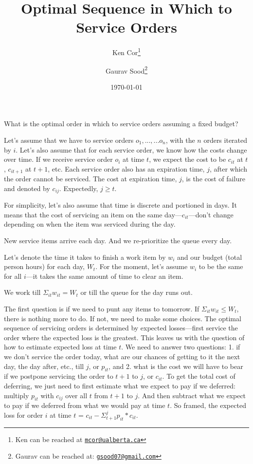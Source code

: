 \documentclass[12pt, letterpaper]{article}
\title{\Large{Optimal Sequence in Which to Service Orders}}
\author{Ken Cor\thanks{Ken can be reached at \href{mailto:mcor@ualberta.ca}{\footnotesize{\texttt{mcor@ualberta.ca}}}} \and Gaurav Sood\thanks{Gaurav can be reached at: \href{mailto:gsood07@gmail.com}{\footnotesize{\texttt{gsood07@gmail.com}}}}\vspace{.5cm}}
\date{\vspace{.5cm}\normalsize{\today}}
\begin{document}
\maketitle

\begin{comment}

setwd(paste0(githubdir, "optimal_sequence/ms/"))
tools::texi2dvi("optimal_sequence.tex", pdf = TRUE, clean = TRUE) 
setwd(githubdir)

\end{comment}

\doublespacing

What is the optimal order in which to service orders assuming a fixed budget?

Let's assume that we have to service orders $o_1,...,...o_n$, with the $n$ orders iterated by $i$. Let's also assume that for each service order, we know how the costs change over time. If we receive service order $o_i$ at time $t$, we expect the cost to be $c_{it}$ at $t$, $c_{it+1}$ at $t+1$, etc. Each service order also has an expiration time, $j$, after which the order cannot be serviced. The cost at expiration time, $j$, is the cost of failure and denoted by $c_{ij}$. Expectedly, $j \geq t$.

For simplicity, let's also assume that time is discrete and portioned in days. It means that the cost of servicing an item on the same day---$c_{it}$---don't change depending on when the item was serviced during the day.

New service items arrive each day. And we re-prioritize the queue every day.

Let's denote the time it takes to finish a work item by $w_i$ and our budget (total person hours) for each day, $W_t$. For the moment, let's assume $w_i$ to be the same for all $i$---it takes the same amount of time to clear an item.

We work till $\Sigma_{it} w_{it} = W_t$ or till the queue for the day runs out. 

The first question is if we need to punt any items to tomorrow. If $\Sigma_{it} w_{it} \leq W_t$, there is nothing more to do. If not, we need to make some choices. The optimal sequence of servicing orders is determined by expected losses---first service the order where the expected loss is the greatest. This leaves us with the question of how to estimate expected loss at time $t$. We need to answer two questions: 1. if we don't service the order today, what are our chances of getting to it the next day, the day after, etc., till $j$, or $p_{it}$, and 2. what is the cost we will have to bear if we postpone servicing the order to $t+1$ to $j$, or $c_{it}$. To get the total cost of deferring, we just need to first estimate what we expect to pay if we deferred: multiply $p_{it}$ with $c_{ij}$ over all $t$ from $t+1$ to $j$. And then subtract what we expect to pay if we deferred from what we would pay at time $t$. So framed, the expected loss for order $i$ at time $t$ = $c_{it} - \Sigma_{t+1}^{j} p_{it} * c_{it}$.
\end{document}
